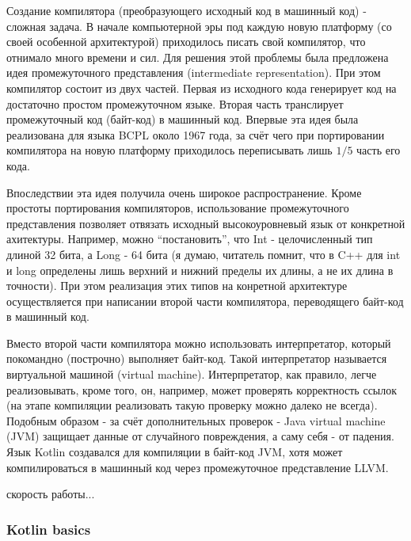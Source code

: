 \documentclass{book}
\begin{document}
Создание компилятора (преобразующего исходный код в машинный код) - сложная задача. В начале
компьютерной эры под каждую новую платформу (со своей особенной архитектурой) приходилось писать
свой компилятор, что отнимало много времени и сил. Для решения этой проблемы была предложена идея
промежуточного представления (intermediate representation). При этом компилятор состоит из двух
частей. Первая из исходного кода генерирует код на достаточно простом промежуточном языке. Вторая
часть транслирует промежуточный код (байт-код) в машинный код. Впервые эта идея была реализована
для языка BCPL около 1967 года, за счёт чего при портировании компилятора на новую платформу
приходилось переписывать лишь $1/5$ часть его кода.

Впоследствии эта идея получила очень широкое распространение. Кроме простоты портирования
компиляторов, использование промежуточного представления позволяет отвязать исходный
высокоуровневый язык от конкретной ахитектуры. Например, можно ``постановить'', что Int -
целочисленный тип длиной 32 бита, а Long - 64 бита (я думаю, читатель помнит, что в C++ для int и
long определены лишь верхний и нижний пределы их длины, а не их длина в точности). При этом
реализация этих типов на конретной архитектуре осуществляется при написании второй части
компилятора, переводящего байт-код в машинный код.

Вместо второй части компилятора можно использовать интерпретатор, который покомандно (построчно)
выполняет байт-код. Такой интерпретатор называется виртуальной машиной (virtual machine).
Интерпретатор, как правило, легче реализовывать, кроме того, он, например, может проверять
корректность ссылок (на этапе компиляции реализовать такую проверку можно далеко не всегда).
Подобным образом - за счёт дополнительных проверок - Java virtual machine (JVM) защищает данные от
случайного повреждения, а саму себя - от падения. Язык Kotlin создавался для компиляции в байт-код
JVM, хотя может компилироваться в машинный код через промежуточное представление LLVM.

скорость работы...

\subsubsection{Kotlin basics}
\end{document}
